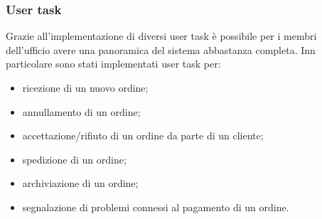 \subsubsection{User task}
Grazie all'implementazione di diversi user task \`e possibile per i
membri dell'ufficio avere una panoramica del sistema abbastanza
completa. Inn particolare sono stati implementati user task per:
\begin{itemize}
  \item ricezione di un nuovo ordine;
  \item annullamento di un ordine;
  \item accettazione/rifiuto di un ordine da parte di un cliente;
  \item spedizione di un ordine;
  \item archiviazione di un ordine;
  \item segnalazione di problemi connessi al pagamento di un ordine.
\end{itemize}
